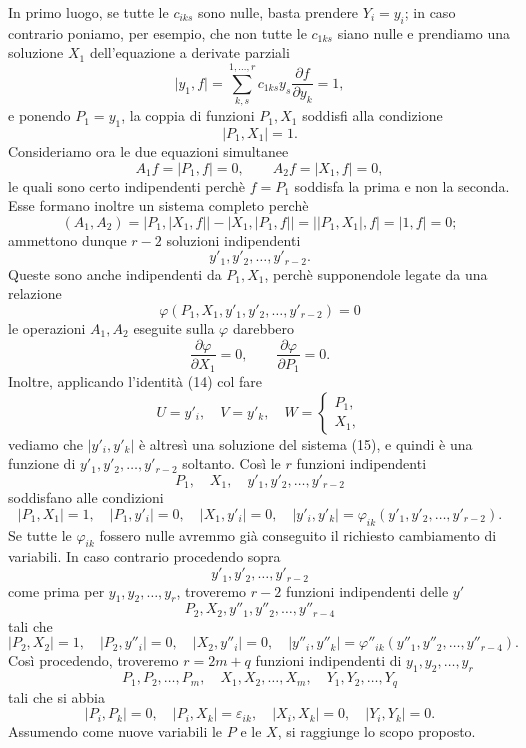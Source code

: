 \documentclass[11pt]{book}
\begin{document}
In primo luogo, se tutte le $c_{iks}$ sono nulle, basta prendere $Y_i=y_i$; in caso contrario poniamo, per esempio, che non tutte le $c_{1ks}$ siano nulle e prendiamo una soluzione $X_1$ dell'equazione a derivate parziali
\[
 \lvert y_1,f\rvert=\sum\limits_{k,s}^{1,\ldots,r}c_{1ks}y_s\frac{\partial f}{\partial y_k}=1,
\]
e ponendo $P_1=y_1$, la coppia di funzioni $P_1,X_1$ soddisfi alla condizione
\[
 \lvert P_1,X_1\rvert=1.
\]
Consideriamo ora le due equazioni simultanee
\begin{equation*}\tag{15}
 A_1f=\lvert P_1,f\rvert=0,
 \qquad
 A_2f=\lvert X_1,f\rvert=0,
\end{equation*}
le quali sono certo indipendenti perchè $f=P_1$ soddisfa la prima e non la seconda. Esse formano inoltre un sistema completo perchè
\[
 (A_1,A_2)=\lvert P_1,\lvert X_1,f\rvert\rvert-
 \lvert X_1,\lvert P_1,f\rvert\rvert=
 \lvert\lvert P_1,X_1\rvert,f\rvert=
 \lvert1,f\rvert=0;
\]
ammettono dunque $r-2$ soluzioni indipendenti
\[
 y'_1,y'_2,\ldots,y'_{r-2}.
\]
Queste sono anche indipendenti da $P_1,X_1$, perchè supponendole legate da una relazione
\[
 \varphi(P_1,X_1,y'_1,y'_2,\ldots,y'_{r-2})=0
\]
le operazioni $A_1,A_2$ eseguite sulla $\varphi$ darebbero
\[
 \frac{\partial\varphi}{\partial X_1}=0,
 \qquad
 \frac{\partial\varphi}{\partial P_1}=0.
\]
Inoltre, applicando l'identità (14) col fare
\[
 U=y'_i,
 \quad V=y'_k,
 \quad W=\begin{cases}P_1,\\ X_1,
 \end{cases}
\]
vediamo che $\lvert y'_i,y'_k\rvert$ è altresì una soluzione del sistema (15), e quindi è una funzione di $y'_1,y'_2,\ldots,y'_{r-2}$ soltanto. Così le $r$ funzioni indipendenti
\[
 P_1,
 \quad X_1,
 \quad y'_1,y'_2,\ldots,y'_{r-2}
\]
soddisfano alle condizioni
\[
 \lvert P_1,X_1\rvert=1,
 \quad \lvert P_1,y'_i\rvert=0,
 \quad \lvert X_1,y'_i\rvert=0,
 \quad
 \lvert y'_i,y'_k\rvert=\varphi_{ik}(y'_1,y'_2,\ldots,y'_{r-2}).
\]
Se tutte le $\varphi_{ik}$ fossero nulle avremmo già conseguito il richiesto cambiamento di variabili. In caso contrario procedendo sopra
\[
 y'_1,y'_2,\ldots,y'_{r-2}
\]
come prima per $y_1,y_2,\ldots,y_r$, troveremo $r-2$ funzioni indipendenti delle $y'$
\[
 P_2,
 X_2,
 y''_1,y''_2,\ldots,y''_{r-4}
\]
tali che
\[
 \lvert P_2,X_2\rvert=1,
 \quad \lvert P_2,y''_i\rvert=0,
 \quad \lvert X_2,y''_i\rvert=0,
 \quad
 \lvert y''_i,y''_k\rvert=\varphi''_{ik}(y''_1,y''_2,\ldots,y''_{r-4}).
\]
Così procedendo, troveremo $r=2m+q$ funzioni indipendenti di $y_1,y_2,\ldots,y_r$
\[
 P_1,P_2,\ldots,P_m,
 \quad X_1,X_2,\ldots,X_m,
 \quad Y_1,Y_2,\ldots,Y_q
\]
tali che si abbia
\begin{equation*}\tag{16}
 \lvert P_i,P_k\rvert=0,
 \quad \lvert P_i,X_k\rvert=\varepsilon_{ik},
 \quad \lvert X_i,X_k\rvert=0,
 \quad \lvert Y_i,Y_k\rvert=0.
\end{equation*}
Assumendo come nuove variabili le $P$ e le $X$, si raggiunge lo scopo proposto.
\end{document}
